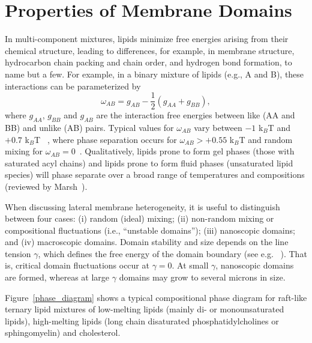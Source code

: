 \documentclass[8.5pt,twoside,twocolumn]{article}
\begin{document}
\section{Properties of Membrane Domains}

In multi-component mixtures, lipids minimize free energies arising from their chemical structure, leading to differences, for example, in membrane structure, hydrocarbon chain packing and chain order, and hydrogen bond formation, to name but a few. For example, in a binary mixture of lipids (e.g., A and B), these interactions can be parameterized by~\cite{Hill.1986}
\begin{equation}
	\omega_{AB} = g_{AB}-\frac{1}{2}\left( g_{AA}+g_{BB}\right),
\end{equation}
where $g_{AA}$, $g_{BB}$ and $g_{AB}$ are the interaction free energies between like (AA and BB) and unlike (AB) pairs. Typical values for $\omega_{AB}$ vary between $-1$ k$_B$T and $+0.7$ k$_B$T ~\cite{Almeida.2009}, where phase separation occurs for $\omega_{AB} > +0.55$ k$_B$T and random mixing for $\omega_{AB} = 0$~\cite{Heberle.2011}. Qualitatively, lipids prone to form gel phases (those with saturated acyl chains) and lipids prone to form fluid phases (unsaturated lipid species) will phase separate over a broad range of temperatures and compositions (reviewed by Marsh~\cite{Marsh.2009,Marsh.2010}).

When discussing lateral membrane heterogeneity, it is useful to distinguish between four cases: (i) random (ideal) mixing; (ii) non-random mixing or compositional fluctuations (i.e., “unstable domains”); (iii) nanoscopic domains; and (iv) macroscopic domains. Domain stability and size depends on the line tension $\gamma$, which defines the free energy of the domain boundary (see e.g. ~\cite{Kuzmin.2005}). That is, critical domain fluctuations occur at $\gamma = 0$. At small $\gamma$,  nanoscopic domains are formed, whereas at large $\gamma$ domains may grow to several microns in size. 

Figure~\ref{phase_diagram} shows a typical compositional phase diagram for raft-like ternary lipid mixtures of low-melting lipids (mainly di- or monounsaturated lipids), high-melting lipids (long chain disaturated phosphatidylcholines or sphingomyelin) and cholesterol. 
\end{document}
